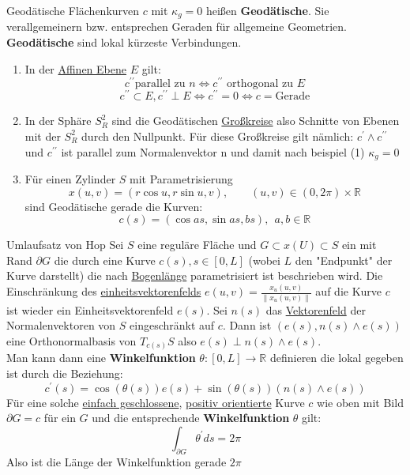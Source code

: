 \begin{titleDef}{Geodätische}
\label{geodaetische}
Flächenkurven $c$ mit $\kappa_g=0$ heißen \textbf{Geodätische}. Sie verallgemeinern bzw. entsprechen Geraden für allgemeine Geometrien. \textbf{Geodätische} sind lokal kürzeste Verbindungen.\par
\begin{enumerate}[label=(\arabic*)]
	\item In der \hyperref[affinEbene]{Affinen Ebene} $E$ gilt:
    $$c^{\prime\prime} \text{parallel zu }n\Longleftrightarrow c^{\prime\prime} \text{ orthogonal zu }E$$
	$$c^{\prime\prime}\subset E, c^{\prime\prime}\perp E\Longleftrightarrow c^{\prime\prime}=0 \Longleftrightarrow c=\text{Gerade}$$
	\item In der Sphäre $S_R^2$ sind die Geodätischen \hyperref[grosskreis]{Großkreise} also Schnitte von Ebenen mit der $S_R^2$ durch den Nullpunkt. Für diese Großkreise gilt nämlich: $c^\prime\wedge c^{\prime\prime}$ und $c^{\prime\prime}$ ist parallel zum Normalenvektor n und damit nach beispiel (1) $\kappa_g=0$
	\item Für einen Zylinder $S$ mit Parametrisierung
	$$x(u,v)=(r\cos u,r\sin u,v),\qquad (u,v)\in(0,2\pi)\times\mathbb{R}$$
	sind Geodätische gerade die Kurven:
	$$c(s)=(\cos as,\sin as,bs),\:\: a,b\in\mathbb{R}$$
\end{enumerate}
\end{titleDef}

\begin{titleDef}{Umlaufsatz von Hop}
\label{umlaufHop}
Sei $S$ eine reguläre Fläche und $G\subset x(U)\subset S$ ein \aeGebiet mit Rand $\partial G$ die durch eine Kurve $c(s), s\in[0,L]$ (wobei $L$ den "Endpunkt" der Kurve darstellt) die nach \hyperref[bogenlaenge]{Bogenlänge} parametrisiert ist beschrieben wird. Die Einschränkung des \hyperref[einheitsvekfeld]{einheitsvektorenfelds} $e(u,v)=\frac{x_u(u,v)}{\lVert x_u(u,v)\rVert}$ auf die Kurve $c$ ist wieder ein Einheitsvektorenfeld $e(s)$. Sei $n(s)$ das \hyperref[vektorenfeld]{Vektorenfeld} der Normalenvektoren von $S$ eingeschränkt auf $c$. Dann ist $(e(s),n(s)\wedge e(s))$ eine Orthonormalbasis von $T_{c(s)}S$ also $e(s)\perp n(s)\wedge e(s)$.\\
Man kann dann eine \textbf{Winkelfunktion} $\theta:[0,L]\to\mathbb{R}$ definieren die lokal gegeben ist durch die Beziehung:
$$c^\prime(s)=\cos(\theta(s))e(s)+\sin(\theta(s))(n(s)\wedge e(s))$$
Für eine solche \hyperref[einfachgeschlossen]{einfach geschlossene}, \hyperref[orientierbar]{positiv orientierte} Kurve $c$ wie oben mit Bild $\partial G=c$ für ein \aeGebiet $G$ und die entsprechende \textbf{Winkelfunktion} $\theta$ gilt:
$$\int_{\partial G}\theta^\prime ds=2\pi$$
Also ist die Länge der Winkelfunktion gerade $2\pi$
\end{titleDef}

